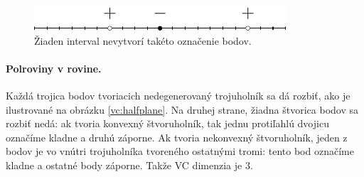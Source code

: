 \begin{figure}
  \centering
  \includegraphics[scale=1]{obrazky/interval.pdf}
  \caption{Žiaden interval nevytvorí takéto označenie bodov.}
  \label{vc:interval}
\end{figure}

\paragraph{Polroviny v rovine.} Každá trojica bodov tvoriacich
nedegenerovaný trojuholník sa dá rozbiť, ako je ilustrované na
obrázku \ref{vc:halfplane}. Na druhej strane, žiadna štvorica bodov
sa rozbiť nedá: ak tvoria konvexný štvoruholník, tak jednu protiľahlú 
dvojicu označíme kladne a druhú záporne. Ak tvoria nekonvexný 
štvoruholník, jeden z bodov je vo vnútri trojuholníka tvoreného 
ostatnými tromi: tento bod označíme kladne a ostatné body záporne.
Takže VC dimenzia je $3$.

